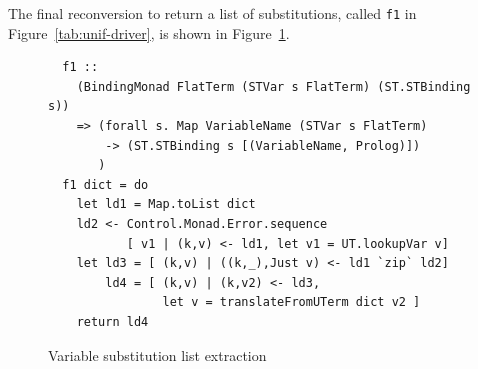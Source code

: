 \documentclass[thesis-solanki.tex]{subfiles}
\begin{document}
The final reconversion to return a list of substitutions,
  called \texttt{f1} in Figure~\ref{tab:unif-driver}, is shown in
  Figure~\ref{tab:vars-extract}.
\begin{figure}
  \begin{verbatim}
  f1 ::
    (BindingMonad FlatTerm (STVar s FlatTerm) (ST.STBinding s))
    => (forall s. Map VariableName (STVar s FlatTerm)
        -> (ST.STBinding s [(VariableName, Prolog)])
       )
  f1 dict = do
    let ld1 = Map.toList dict
    ld2 <- Control.Monad.Error.sequence
           [ v1 | (k,v) <- ld1, let v1 = UT.lookupVar v]
    let ld3 = [ (k,v) | ((k,_),Just v) <- ld1 `zip` ld2]
        ld4 = [ (k,v) | (k,v2) <- ld3,
                let v = translateFromUTerm dict v2 ]
    return ld4
  \end{verbatim}
  \vspace*{-1.0\baselineskip}
  \caption{Variable substitution list extraction}
  \label{tab:vars-extract}
\end{figure}
\end{document}
